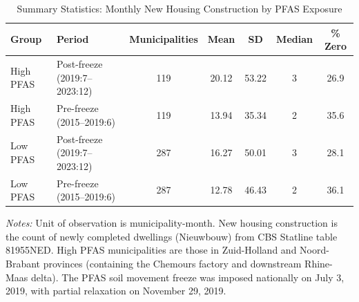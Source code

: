 \begin{table}[htbp]
\centering
\caption{Summary Statistics: Monthly New Housing Construction by PFAS Exposure}
\label{tab:summary}
\begin{threeparttable}
\small
\begin{tabular}{llccccc}
\hline\hline
Group & Period & Municipalities & Mean & SD & Median & \% Zero \\
\hline
High PFAS & Post-freeze (2019:7--2023:12) & 119 & 20.12 & 53.22 & 3 & 26.9 \\
High PFAS & Pre-freeze (2015--2019:6) & 119 & 13.94 & 35.34 & 2 & 35.6 \\
\hline
Low PFAS & Post-freeze (2019:7--2023:12) & 287 & 16.27 & 50.01 & 3 & 28.1 \\
Low PFAS & Pre-freeze (2015--2019:6) & 287 & 12.78 & 46.43 & 2 & 36.1 \\
\hline\hline
\end{tabular}
\begin{tablenotes}[flushleft]
\small
\item \textit{Notes:} Unit of observation is municipality-month. New housing construction is the count of newly completed dwellings (Nieuwbouw) from CBS Statline table 81955NED. High PFAS municipalities are those in Zuid-Holland and Noord-Brabant provinces (containing the Chemours factory and downstream Rhine-Maas delta). The PFAS soil movement freeze was imposed nationally on July 3, 2019, with partial relaxation on November 29, 2019.
\end{tablenotes}
\end{threeparttable}
\end{table}

